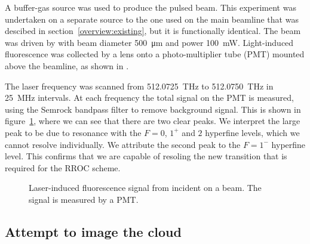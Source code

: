A buffer-gas source  was used to produce the pulsed \CaF{} beam.  This
experiment was undertaken on a separate \CaF{} source to the one used on the
main beamline that was descibed in section~\ref{overview:existing}, but it is
functionally identical.  The beam was driven by  with beam
diameter \SI{500}{\micro\meter} and power \SI{100}{\milli\watt}.  Light-induced
fluorescence was collected by a lens onto a photo-multiplier tube (PMT) mounted
above the beamline, as shown in .

The laser frequency was scanned from \SI{512.0725}{\tera\hertz} to
\SI{512.0750}{\tera\hertz} in \SI{25}{\mega\hertz} intervals. At each
frequency the total signal on the PMT is measured, using the Semrock
bandpass filter to remove background signal. This is shown in
figure~\ref{exper:fig:beamresult}, where we can see that there are two clear
peaks. We interpret the large peak to be due to resonance with the $F=0$, $1^+$
and $2$ hyperfine levels, which we cannot resolve individually. We attribute
the second peak to the $F=1^-$ hyperfine level. This confirms that we are
capable of resoling the new transition that is required for the RROC scheme.

\begin{figure}[htb]
  \centering
  \caption[Fluorescence from \CaF{} due to ]{
    Laser-induced fluorescence signal from  incident on a
  \CaF{} beam. The signal is measured by a PMT.}
  \label{exper:fig:beamresult}
\end{figure}

\subsection{Attempt to image the \CaF{} cloud}

